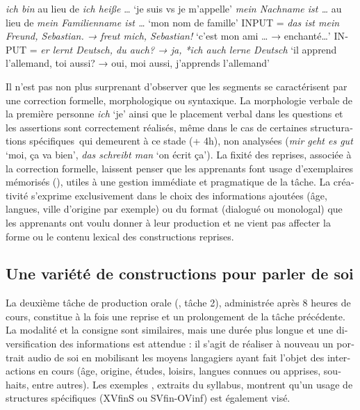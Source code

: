 \documentclass[output=paper]{langscibook}
\begin{document}
\begin{otherlanguage}{french}
\ea%
    \label{ex:felce:4}
    \ea \textit{ich bin} au lieu de \textit{ich heiße} … `je suis vs je m’appelle'
    \ex \textit{mein Nachname ist …} au lieu de \textit{mein Familienname ist …} `mon nom de famille'
     \z
\ex%
    \label{ex:felce:5}
    \ea INPUT = \textit{das ist mein Freund, Sebastian. → freut mich, Sebastian!} `c’est mon ami … → enchanté…'
    \ex INPUT = \textit{er lernt Deutsch, du auch? → ja, *ich auch lerne Deutsch}  `il apprend l’allemand, toi aussi? → oui, moi aussi, j’apprends l’allemand'
    \z
\z


Il n’est pas non plus surprenant d’observer que les segments se caractérisent par une correction formelle, morphologique ou syntaxique. La morphologie verbale de la première personne \textit{ich} `je' ainsi que le placement verbal dans les questions et les assertions sont correctement réalisés, même dans le cas de certaines structurations spécifiques~qui demeurent à ce stade (+ 4h), non analysées (\textit{mir geht es gut} `moi, ça va bien', \textit{das schreibt man} `on écrit ça'). La fixité des reprises, associée à la correction formelle, laissent penser que les apprenants font usage d’exemplaires mémorisés (\citealt[88]{Myles2012}), utiles à une gestion immédiate et pragmatique de la tâche. La créativité s’exprime exclusivement dans le choix des informations ajoutées (âge, langues, ville d’origine par exemple) ou du format (dialogué ou monologal) que les apprenants ont voulu donner à leur production et ne vient pas affecter la forme ou le contenu lexical des constructions reprises.

\subsection{Une variété de constructions pour parler de soi}\label{sec:felce:6.2}

La deuxième tâche de production orale (, tâche 2), administrée après 8 heures de cours, constitue à la fois une reprise et un prolongement de la tâche précédente. La modalité et la consigne sont similaires, mais une durée plus longue et une diversification des informations est attendue : il s’agit de réaliser à nouveau un portrait audio de soi en mobilisant les moyens langagiers ayant fait l’objet des interactions en cours (âge, origine, études, loisirs, langues connues ou apprises, souhaits, entre autres). Les exemples , extraits du syllabus, montrent qu’un usage de structures spécifiques
(XVfinS ou SVfin-OVinf) est également visé.


\end{otherlanguage}
\end{document}
